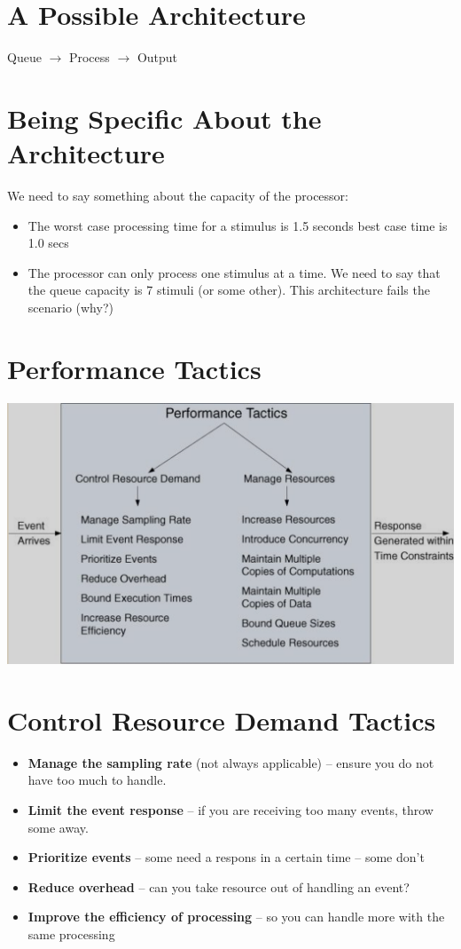 \documentclass{report}
\begin{document}
\section{A Possible Architecture}

Queue $\rightarrow$ Process $\rightarrow$ Output

\section{Being Specific About the Architecture}

We need to say something about the capacity of the processor:
\begin{itemize}
\item{The worst case processing time for a stimulus is 1.5 seconds best case time is 1.0 secs}
\item{The processor can only process one stimulus at a time.}
We need to say that the queue capacity is 7 stimuli (or some other).
This architecture fails the scenario (why?)
\end{itemize}

\section{Performance Tactics}
\includegraphics[scale=0.6]{zxc.png}

\section{Control Resource Demand Tactics}

\begin{itemize}
\item{\textbf{Manage the sampling rate} (not always applicable) – ensure you do not have too much to handle.}
\item{\textbf{Limit the event response} – if you are receiving too many events, throw some away.}
\item{\textbf{Prioritize events} – some need a respons in a certain time – some don’t}
\item{\textbf{Reduce overhead} – can you take resource out of handling an event?}
\item{\textbf{Improve the efficiency of processing} – so you can handle more with the same processing}
\end{itemize}
\end{document}

